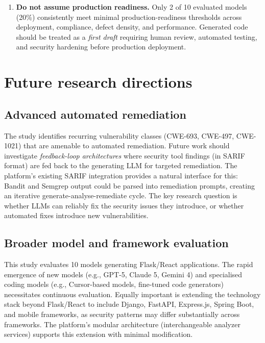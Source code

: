 \begin{enumerate}
    \item \textbf{Do not assume production readiness.} Only 2 of 10 evaluated models (20\%) consistently meet minimal production-readiness thresholds across deployment, compliance, defect density, and performance. Generated code should be treated as a \textit{first draft} requiring human review, automated testing, and security hardening before production deployment.
\end{enumerate}

\section{Future research directions}

\subsection{Advanced automated remediation}

The study identifies recurring vulnerability classes (CWE-693, CWE-497, CWE-1021) that are amenable to automated remediation. Future work should investigate \textit{feedback-loop architectures} where security tool findings (in SARIF format) are fed back to the generating LLM for targeted remediation. The platform's existing SARIF integration provides a natural interface for this: Bandit and Semgrep output could be parsed into remediation prompts, creating an iterative generate-analyse-remediate cycle. The key research question is whether LLMs can reliably fix the security issues they introduce, or whether automated fixes introduce new vulnerabilities.

\subsection{Broader model and framework evaluation}

This study evaluates 10 models generating Flask/React applications. The rapid emergence of new models (e.g., GPT-5, Claude 5, Gemini 4) and specialised coding models (e.g., Cursor-based models, fine-tuned code generators) necessitates continuous evaluation. Equally important is extending the technology stack beyond Flask/React to include Django, FastAPI, Express.js, Spring Boot, and mobile frameworks, as security patterns may differ substantially across frameworks. The platform's modular architecture (interchangeable analyzer services) supports this extension with minimal modification.

